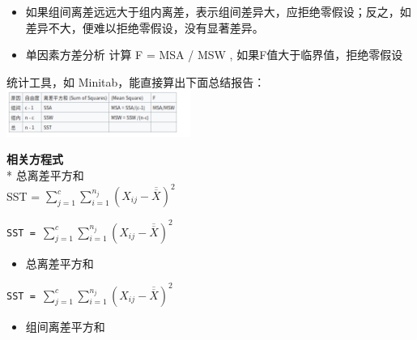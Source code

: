 \begin{description}
\begin{description}
\begin{itemize}
\tightlist
\item
  如果组间离差远远大于组内离差，表示组间差异大，应拒绝零假设；反之，如差异不大，便难以拒绝零假设，没有显著差异。
\end{itemize}

\begin{itemize}
\tightlist
\item
  单因素方差分析 计算 F = MSA / MSW , 如果F值大于临界值，拒绝零假设
\end{itemize}

统计工具，如 Minitab，能直接算出下面总结报告：\\


\includegraphics[width=6cm]{Screenshotfrom2023-02-1401-07-07.png}

\textbf{相关方程式}\\
* 总离差平方和\\
SST =
\(\sum_{j=1}^c \sum_{i=1}^{n_j} (X_{ij} - \overline{\overline{X}})^2\)
\end{description}
\end{description}

\texttt{SST~=~}\(\sum_{j=1}^c \sum_{i=1}^{n_j} (X_{ij} - \overline{\overline{X}})^2\)

\begin{itemize}
\tightlist
\item
  总离差平方和\\
\end{itemize}

\texttt{SST~=~}\(\sum_{j=1}^c \sum_{i=1}^{n_j} (X_{ij} - \overline{\overline{X}})^2\)


\begin{description}
\item[]
\end{description}

\begin{itemize}
\tightlist
\item
  组间离差平方和\\
\end{itemize}

